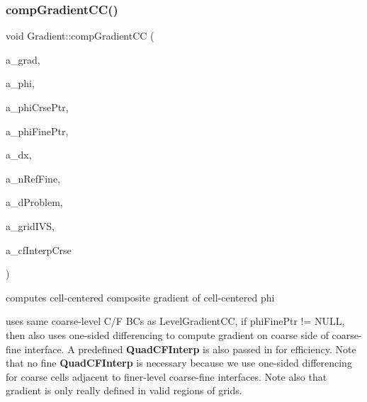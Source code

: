 \subsubsection{\texorpdfstring{comp\+Gradient\+C\+C()}{compGradientCC()}\hspace{0.1cm}{\footnotesize\ttfamily [3/6]}}
{\footnotesize\ttfamily void Gradient\+::comp\+Gradient\+CC (\begin{DoxyParamCaption}\item[{\textbf{ Level\+Data}$<$ \textbf{ F\+Array\+Box} $>$ \&}]{a\+\_\+grad,  }\item[{\textbf{ Level\+Data}$<$ \textbf{ F\+Array\+Box} $>$ \&}]{a\+\_\+phi,  }\item[{const \textbf{ Level\+Data}$<$ \textbf{ F\+Array\+Box} $>$ $\ast$}]{a\+\_\+phi\+Crse\+Ptr,  }\item[{const \textbf{ Level\+Data}$<$ \textbf{ F\+Array\+Box} $>$ $\ast$}]{a\+\_\+phi\+Fine\+Ptr,  }\item[{const \textbf{ Real}}]{a\+\_\+dx,  }\item[{const int}]{a\+\_\+n\+Ref\+Fine,  }\item[{const \textbf{ Problem\+Domain} \&}]{a\+\_\+d\+Problem,  }\item[{const \textbf{ Layout\+Data}$<$ \textbf{ Int\+Vect\+Set} $>$ \&}]{a\+\_\+grid\+I\+VS,  }\item[{\textbf{ Quad\+C\+F\+Interp} \&}]{a\+\_\+cf\+Interp\+Crse }\end{DoxyParamCaption})\hspace{0.3cm}{\ttfamily [static]}}



computes cell-\/centered composite gradient of cell-\/centered phi 

uses same coarse-\/level C/F BC\textquotesingle{}s as Level\+Gradient\+CC, if phi\+Fine\+Ptr != N\+U\+LL, then also uses one-\/sided differencing to compute gradient on coarse side of coarse-\/fine interface. A predefined \textbf{ Quad\+C\+F\+Interp} is also passed in for efficiency. Note that no fine \textbf{ Quad\+C\+F\+Interp} is necessary because we use one-\/sided differencing for coarse cells adjacent to finer-\/level coarse-\/fine interfaces. Note also that gradient is only really defined in valid regions of grids. \mbox{\label{class_gradient_a4f44d7eef3d2b675d9c67c90b9904747}} 
